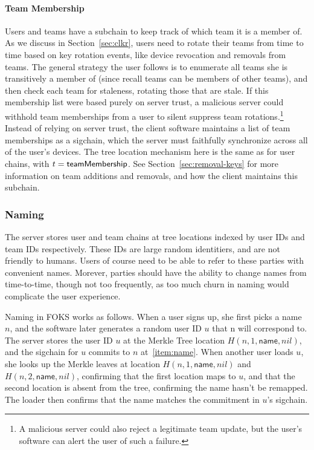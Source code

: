 \paragraph{Team Membership} Users and teams have a subchain to keep track
of which team it is a member of. As we discuss in Section~\ref{sec:clkr},
users need to rotate their teams from time to time based on key rotation
events, like device revocation and removals from teams. The general strategy
the user follows is to enumerate all teams she is transitively a member
of (since recall teams can be members of other teams), and then check
each team for staleness, rotating those that are stale. If this membership
list were based purely on server trust, a malicious server could withhold
team memberships from a user to silent suppress team rotations.\footnote{
    A malicious server could also reject a legitimate team update, but the user's
    software can alert the user of such a failure.
} Instead of relying on server trust, the client software maintains a list
of team memberships as a sigchain, which the server must faithfully
synchronize across all of the user's devices. The tree location
mechanism here is the same as for user chains, with $t = \textsf{teamMembership}$.
See Section~\ref{sec:removal-keys} for more information on team additions
and removals, and how the client maintains this subchain.

\subsubsection{Naming}
\label{sec:naming}

The server stores user and team chains at tree locations indexed by user IDs
and team IDs respectively. These IDs are large random identitiers, and are not
friendly to humans. Users of course need to be able to refer to these parties
with convenient names. Morever, parties should have the ability to change
names from time-to-time, though not too frequently, as too much churn in naming would
complicate the user experience. 

Naming in FOKS works as follows. When a user signs up, she first picks a name
$n$, and the software later generates a random user ID $u$ that n will
correspond to. The server stores the user ID $u$ at the Merkle Tree
location $H(n, 1, \textsf{name}, nil)$, and the sigchain for $u$
commits to $n$ at~\ref{item:name}. When another user loads $u$, she
looks up the Merkle leaves at location $H(n, 1, \textsf{name}, nil)$
and $H(n, 2, \textsf{name}, nil)$, confirming that the first location
maps to $u$, and that the second location is absent from the tree,
confirming the name hasn't be remapped. The loader then confirms
that the name matches the commitment in $u$'s sigchain. 

